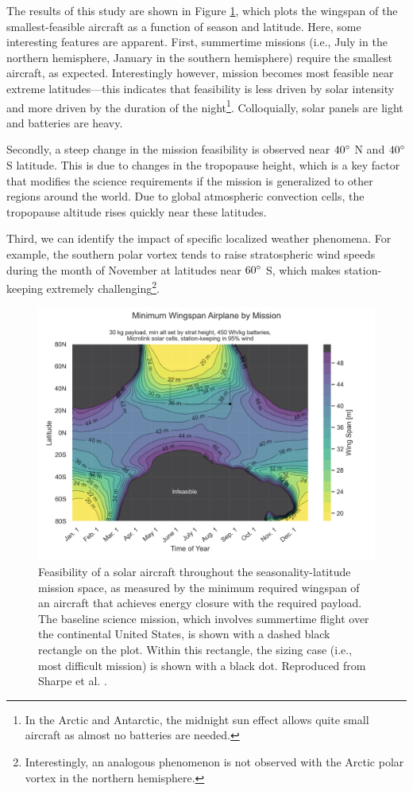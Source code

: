 The results of this study are shown in Figure \ref{fig:dawn_wingspan}, which plots the wingspan of the smallest-feasible aircraft as a function of season and latitude. Here, some interesting features are apparent. First, summertime missions (i.e., July in the northern hemisphere, January in the southern hemisphere) require the smallest aircraft, as expected. Interestingly however, mission becomes most feasible near extreme latitudes—this indicates that feasibility is less driven by solar intensity and more driven by the duration of the night\footnote{In the Arctic and Antarctic, the midnight sun effect allows quite small aircraft as almost no batteries are needed.}. Colloquially, solar panels are light and batteries are heavy.

Secondly, a steep change in the mission feasibility is observed near $40\degree$ N and $40\degree$ S latitude. This is due to changes in the tropopause height, which is a key factor that modifies the science requirements if the mission is generalized to other regions around the world. Due to global atmospheric convection cells, the tropopause altitude rises quickly near these latitudes.

Third, we can identify the impact of specific localized weather phenomena. For example, the southern polar vortex tends to raise stratospheric wind speeds during the month of November at latitudes near $60\degree$ S, which makes station-keeping extremely challenging\footnote{Interestingly, an analogous phenomenon is not observed with the Arctic polar vortex in the northern hemisphere.}.

\begin{figure}[h]
    \centering
    \includegraphics[width=\textwidth]{../figures/dawnfigures/30kg_payloadw_mission.png}
    \caption{Feasibility of a solar aircraft throughout the seasonality-latitude mission space, as measured by the minimum required wingspan of an aircraft that achieves energy closure with the required payload. The baseline science mission, which involves summertime flight over the continental United States, is shown with a dashed black rectangle on the plot. Within this rectangle, the sizing case (i.e., most difficult mission) is shown with a black dot. Reproduced from Sharpe et al. \cite{sharpe_optimization_2021}.}
    \label{fig:dawn_wingspan}
\end{figure}

